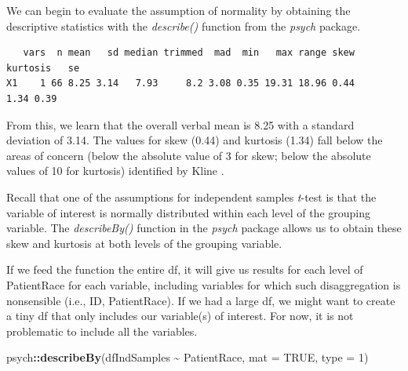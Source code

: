 \documentclass[
  11pt,
]{book}
\newenvironment{Shaded}{\begin{snugshade}}{\end{snugshade}}
\newcommand{\AttributeTok}[1]{\textcolor[rgb]{0.27,0.27,0.27}{#1}}
\newcommand{\CommentTok}[1]{\textcolor[rgb]{0.37,0.37,0.37}{\textit{#1}}}
\newcommand{\ConstantTok}[1]{\textcolor[rgb]{0.37,0.37,0.37}{#1}}
\newcommand{\DecValTok}[1]{\textcolor[rgb]{0.06,0.06,0.06}{#1}}
\newcommand{\FunctionTok}[1]{\textcolor[rgb]{0.27,0.27,0.27}{\textbf{#1}}}
\newcommand{\NormalTok}[1]{#1}
\newcommand{\SpecialCharTok}[1]{\textcolor[rgb]{0.43,0.43,0.43}{\textbf{#1}}}
\begin{document}
We can begin to evaluate the assumption of normality by obtaining the descriptive statistics with the \emph{describe()} function from the \emph{psych} package.

\begin{Shaded}
\end{Shaded}

\begin{verbatim}
   vars  n mean   sd median trimmed  mad  min   max range skew kurtosis   se
X1    1 66 8.25 3.14   7.93     8.2 3.08 0.35 19.31 18.96 0.44     1.34 0.39
\end{verbatim}

From this, we learn that the overall verbal mean is 8.25 with a standard deviation of 3.14. The values for skew (0.44) and kurtosis (1.34) fall below the areas of concern (below the absolute value of 3 for skew; below the absolute values of 10 for kurtosis) identified by Kline \citeyearpar{kline_data_2016}.

Recall that one of the assumptions for independent samples \emph{t}-test is that the variable of interest is normally distributed within each level of the grouping variable. The \emph{describeBy()} function in the \emph{psych} package allows us to obtain these skew and kurtosis at both levels of the grouping variable.

If we feed the function the entire df, it will give us results for each level of PatientRace for each variable, including variables for which such disaggregation is nonsensible (i.e., ID, PatientRace). If we had a large df, we might want to create a tiny df that only includes our variable(s) of interest. For now, it is not problematic to include all the variables.

\begin{Shaded}
\begin{Highlighting}[]
\NormalTok{psych}\SpecialCharTok{::}\FunctionTok{describeBy}\NormalTok{(dfIndSamples }\SpecialCharTok{\textasciitilde{}}\NormalTok{ PatientRace, }\AttributeTok{mat =} \ConstantTok{TRUE}\NormalTok{, }\AttributeTok{type =} \DecValTok{1}\NormalTok{)}
\end{Highlighting}
\end{Shaded}
\end{document}
